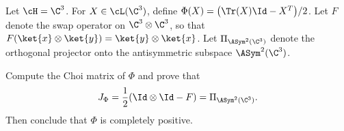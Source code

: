 Let $\cH=\C^3$. For $X\in\cL(\C^3)$, define $\Phi(X)=\bigl(\Tr(X)\Id-X^T\bigr)/2$. Let $F$ denote the swap operator on $\C^3\otimes\C^3$, so that $F(\ket{x}\otimes\ket{y})=\ket{y}\otimes\ket{x}$.
Let $\Pi_{\ASym^2(\C^3)}$ denote the orthogonal projector onto the antisymmetric subspace $\ASym^2(\C^3)$.

Compute the Choi matrix of $\Phi$ and prove that
$$
J_\Phi=\frac{1}{2}(\Id\otimes\Id-F)=\Pi_{\ASym^2(\C^3)}.
$$
Then conclude that $\Phi$ is completely positive.
